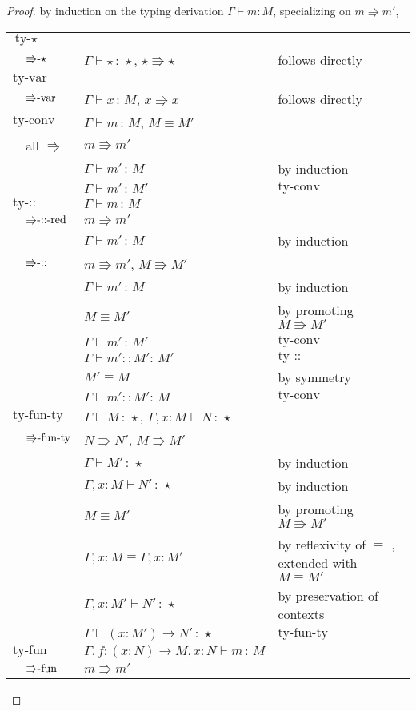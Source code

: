 \begin{proof}
by induction on the typing derivation $\Gamma\vdash m:M$, specializing
on $m\Rrightarrow m'$,


\begin{tabular}{llll}
\multicolumn{4}{l}{$\textrm{ty-}\star$}\tabularnewline
 & $\textrm{\ensuremath{\Rrightarrow}-}\star$ & $\Gamma\vdash\star\,:\,\star$, $\star\Rrightarrow\star$ & follows directly\tabularnewline
\multicolumn{4}{l}{$\textrm{ty-var}$}\tabularnewline
 & $\textrm{\ensuremath{\Rrightarrow}-var}$ & $\Gamma\vdash x\,:\,M$, $x\Rrightarrow x$ & follows directly\tabularnewline
\multicolumn{2}{l}{$\textrm{ty-conv}$} & $\Gamma\vdash m\,:\,M$, $M\equiv M'$  & \tabularnewline
 & all $\Rrightarrow$  & $m\Rrightarrow m'$ & \tabularnewline
 &  & $\Gamma\vdash m'\,:\,M$ & by induction \tabularnewline
 &  & $\Gamma\vdash m'\,:\,M'$ & $\textrm{ty-conv}$\tabularnewline
\multicolumn{2}{l}{$\textrm{ty-::}$} & $\Gamma\vdash m\,:\,M$ & \tabularnewline
 & $\textrm{\ensuremath{\Rrightarrow}-::-red}$ & $m\Rrightarrow m'$ & \tabularnewline
 &  & $\Gamma\vdash m'\,:\,M$ & by induction \tabularnewline
 & $\textrm{\ensuremath{\Rrightarrow}-::}$ & $m\Rrightarrow m'$, $M\Rrightarrow M'$ & \tabularnewline
 &  & $\Gamma\vdash m'\,:\,M$ & by induction \tabularnewline
 &  & $M\equiv M'$ & by promoting $M\Rrightarrow M'$\tabularnewline
 &  & $\Gamma\vdash m'\,:\,M'$ & $\textrm{ty-conv}$\tabularnewline
 &  & $\Gamma\vdash m'::M':\,M'$ & $\textrm{ty-::}$\tabularnewline
 &  & $M'\equiv M$ & by symmetry\tabularnewline
 &  & $\Gamma\vdash m'::M':\,M$ & $\textrm{ty-conv}$\tabularnewline
\multicolumn{2}{l}{$\textrm{ty-fun-ty}$} & $\Gamma\vdash M\,:\,\star$, $\Gamma,x:M\vdash N\,:\,\star$ & \tabularnewline
 & $\textrm{\ensuremath{\Rrightarrow}-fun-ty}$ & $N\Rrightarrow N'$, $M\Rrightarrow M'$ & \tabularnewline
 &  & $\Gamma\vdash M'\,:\,\star$ & by induction \tabularnewline
 &  & $\Gamma,x:M\vdash N'\,:\,\star$ & by induction \tabularnewline
 &  & $M\equiv M'$ & by promoting $M\Rrightarrow M'$\tabularnewline
 &  & $\Gamma,x:M\equiv\Gamma,x:M'$ & by reflexivity of $\equiv$ , extended with $M\equiv M'$\tabularnewline
 &  & $\Gamma,x:M'\vdash N'\,:\,\star$ & by preservation of contexts\tabularnewline
 &  & $\Gamma\vdash\left(x:M'\right)\rightarrow N'\,:\,\star$ & $\textrm{ty-fun-ty}$\tabularnewline
\multicolumn{2}{l}{$\textrm{ty-fun}$} & $\Gamma,f:\left(x:N\right)\rightarrow M,x:N\vdash m\,:\,M$ & \tabularnewline
 & $\textrm{\ensuremath{\Rrightarrow}-fun}$ & $m\Rrightarrow m'$ & \tabularnewline

\end{tabular}
\end{proof}
